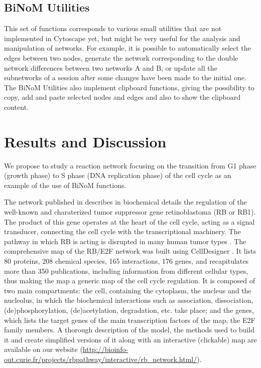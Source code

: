 \documentclass[10pt]{bmc_article}
\newenvironment{bmcformat}{\baselineskip20pt\sloppy\setboolean{publ}{false}}{\baselineskip20pt\sloppy}
\begin{document}
\begin{bmcformat}
\subsection*{BiNoM Utilities}
This set of functions corresponds to various small utilities that are not
implemented in Cytoscape yet, but might be very useful for the analysis and
manipulation of networks. For example, it is possible to automatically select
the edges between two nodes, generate the network corresponding to the double
network differences between two networks A and B, or update all the subnetworks of
a session after some changes have been made to the initial one. The BiNoM Utilities also implement
clipboard functions, giving the possibility to copy, add and paste
selected nodes and edges and also to show the clipboard content.


\section*{Results and Discussion}
We propose to study a reaction network focusing on the transition from G1 phase
(growth phase) to S phase (DNA replication phase) of the cell cycle
\cite{calzone2008comprehensive} as an example of the use of BiNoM functions.

The network published in \cite{calzone2008comprehensive} describes in
biochemical details the regulation of the well-known and charaterized tumor
suppressor gene retinoblastoma (RB or RB1). The product of this gene operates at
the heart of the cell cycle, acting as a signal transducer, connecting the
cell cycle with the transcriptional machinery. The pathway in which RB is
acting is disrupted in many human tumor types \cite{weinberg1995retinoblastoma}.
The comprehensive map of the RB/E2F network was built using CellDesigner
\cite{funahashi2003celldesigner}. It lists 80 proteins, 208 chemical species, 165
interactions, 176 genes, and recapitulates more than 350 publications, including
information from different cellular types, thus making the map a generic map of
the cell cycle regulation. It is composed of two main compartments: the cell,
containing the cytoplasm, the nucleus and the nucleolus, in which the
biochemical interactions such as association, dissociation, (de)phosphorylation,
(de)acetylation, degradation, etc. take place; and the genes, which lists the
target genes of the main transcription factors of the map, the E2F family
members.
A thorough description of the model, the methods used to build it and create
simplified versions of it along with an interactive (clickable) map are
available on our website
(\url{http://bioinfo-out.curie.fr/projects/rbpathway/interactive/rb_network.html/}).


\end{bmcformat}
\end{document}
